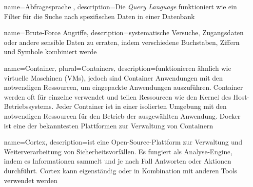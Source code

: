  {
    name={Abfragesprache },
    description={Die \textit{Query Language} funktioniert wie ein Filter für die Suche nach spezifischen Daten in einer Datenbank \citep{at_query}}}




 {
    name={Brute-Force Angriffe},
    description={systematische Versuche, Zugangsdaten oder andere sensible Daten zu erraten, indem verschiedene Buchstaben, Ziffern und Symbole kombiniert werde \citep{Sowmya_BruteForce}}}


 {
    name={Container},
    plural={Containers},
    description={funktionieren ähnlich wie virtuelle Maschinen (VMs), jedoch sind Container Anwendungen mit den notwendigen Ressourcen, um eingepackte Anwendungen auszuführen. Container werden oft für einzelne verwendet und teilen Ressourcen wie den Kernel des Host-Betriebssystems. Jeder Container ist in einer isolierten Umgebung mit den notwendigen Ressourcen für den Betrieb der ausgewählten Anwendung. Docker ist eine der bekanntesten Plattformen zur Verwaltung von Containern \citep{Douglis_Container}}}

 {
    name={Cortex},
    description={ist eine Open-Source-Plattform zur Verwaltung und Weiterverarbeitung von Sicherheitsvorfällen. Es fungiert als Analyse-Engine, indem es Informationen sammelt und je nach Fall Antworten oder Aktionen durchführt. Cortex kann eigenständig oder in Kombination mit anderen Tools verwendet werden \citep{TheHive}}   
}

